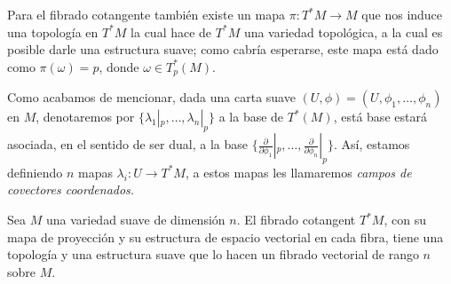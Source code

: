 Para el fibrado cotangente también existe un mapa $\pi: T^{*}M \to M$ que nos induce una topología en $T^{*}M$ la cual hace de $T^{*}M$ una variedad topológica, a la cual es posible darle una estructura suave; como cabría esperarse, este mapa está dado como $\pi(\omega) = p$, donde $\omega \in T_p^{*}(M)$.

Como acabamos de mencionar, dada una carta suave $(U,\phi) = (U,\phi_1,\ldots,\phi_n)$ en $M$, denotaremos por $\{\lambda_1|_p,\ldots,\lambda_n|_p\}$ a la base de $T^*(M)$, está base estará asociada, en el sentido de ser dual, a la base $\{\frac{\partial}{\partial \phi_1}|_p, \ldots, \frac{\partial}{\partial \phi_n}|_p\}$. Así, estamos definiendo $n$ mapas $\lambda_i: U \to T^{*}M$, a estos mapas les llamaremos \it{campos de covectores coordenados}.

\begin{theorem}
	Sea $M$ una variedad suave de dimensión $n$. El fibrado cotangent $T^{*}M$, con su mapa de proyección y su estructura de espacio vectorial en cada fibra, tiene una topología y una estructura suave que lo hacen un fibrado vectorial de rango $n$ sobre $M$.
\end{theorem}

